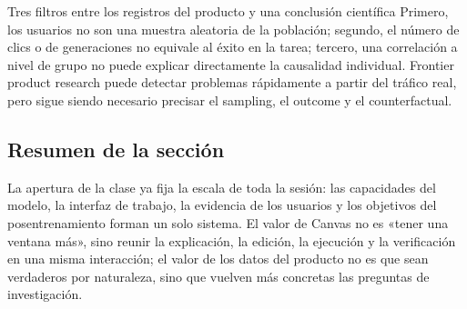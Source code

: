 \begin{warningbox}{Tres filtros entre los registros del producto y una conclusión científica}
Primero, los usuarios no son una muestra aleatoria de la población; segundo, el número de clics o de generaciones no equivale al éxito en la tarea; tercero, una correlación a nivel de grupo no puede explicar directamente la causalidad individual. Frontier product research puede detectar problemas rápidamente a partir del tráfico real, pero sigue siendo necesario precisar el sampling, el outcome y el counterfactual.
\end{warningbox}

\subsection{Resumen de la sección}

La apertura de la clase ya fija la escala de toda la sesión: las capacidades del modelo, la interfaz de trabajo, la evidencia de los usuarios y los objetivos del posentrenamiento forman un solo sistema. El valor de Canvas no es «tener una ventana más», sino reunir la explicación, la edición, la ejecución y la verificación en una misma interacción; el valor de los datos del producto no es que sean verdaderos por naturaleza, sino que vuelven más concretas las preguntas de investigación.
